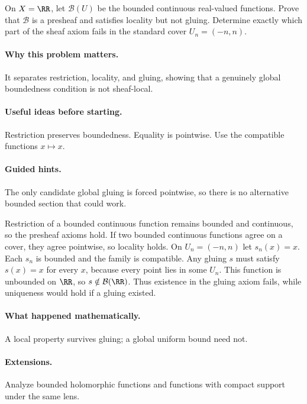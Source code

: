 \begin{problem}
On $X=\RR$, let $\mathcal B(U)$ be the bounded continuous real-valued functions. Prove that $\mathcal B$ is a presheaf and satisfies locality but not gluing. Determine exactly which part of the sheaf axiom fails in the standard cover $U_n=(-n,n)$.
\end{problem}

\paragraph{Why this problem matters.}
It separates restriction, locality, and gluing, showing that a genuinely global boundedness condition is not sheaf-local.

\paragraph{Useful ideas before starting.}
Restriction preserves boundedness. Equality is pointwise. Use the compatible functions $x\mapsto x$.

\paragraph{Guided hints.}
The only candidate global gluing is forced pointwise, so there is no alternative bounded section that could work.

\ifdefined\FullProblemDossiers
\begin{solution}
Restriction of a bounded continuous function remains bounded and continuous, so the presheaf axioms hold. If two bounded continuous functions agree on a cover, they agree pointwise, so locality holds. On $U_n=(-n,n)$ let $s_n(x)=x$. Each $s_n$ is bounded and the family is compatible. Any gluing $s$ must satisfy $s(x)=x$ for every $x$, because every point lies in some $U_n$. This function is unbounded on $\RR$, so $s\notin\mathcal B(\RR)$. Thus existence in the gluing axiom fails, while uniqueness would hold if a gluing existed.
\end{solution}

\paragraph{What happened mathematically.}
A local property survives gluing; a global uniform bound need not.

\paragraph{Extensions.}
Analyze bounded holomorphic functions and functions with compact support under the same lens.
\fi
